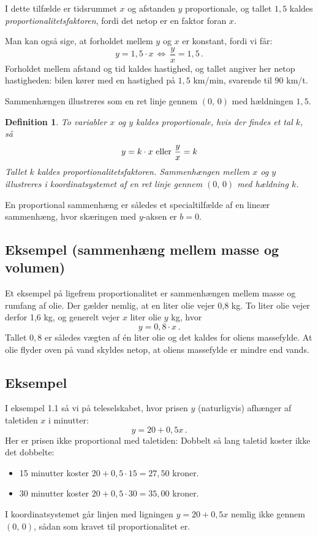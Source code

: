 \documentclass[12pt,oneside,a4paper]{article}
\newtheorem{mydef}[thm]{Definition}
\begin{document}
I dette tilfælde er tidsrummet $x$ og afstanden $y$ proportionale, og tallet
$1,5$ kaldes {\em proportionalitetsfaktoren}, fordi det netop er en faktor foran $x$.

Man kan også sige, at forholdet mellem $y$ og $x$ er konstant, fordi vi får:
\[
y = 1,5\cdot x \, \Leftrightarrow \, \frac{y}{x} = 1,5 \,.
\]
Forholdet mellem afstand og tid kaldes hastighed, og tallet angiver her netop
hastigheden: bilen kører med en hastighed på $1,5$ km/min, svarende til $90$
km/t.

Sammenhængen illustreres som en ret linje gennem $(0,\,0)$ med hældningen $1,5$.

\begin{tcolorbox}
\begin{mydef}
    To variabler $x$ og $y$ kaldes proportionale, hvis der findes et tal $k$, så
    $$
    y = k\cdot x \,\, {\rm eller} \,\, \frac{y}{x} = k
    $$
    Tallet $k$ kaldes proportionalitetsfaktoren. Sammenhængen mellem $x$ og $y$
    illustreres i koordinatsystemet af en ret linje gennem $(0,\,0)$ med 
    hældning $k$.
\end{mydef}
\end{tcolorbox}

En proportional sammenhæng er således et specialtilfælde af en lineær sammenhæng, hvor
skæringen med $y$-aksen er $b=0$.

\subsection{Eksempel (sammenhæng mellem masse og volumen)}

Et eksempel på ligefrem proportionalitet er sammenhængen mellem masse og rumfang af olie.
Der gælder nemlig, at en liter olie vejer 0,8 kg. To liter olie vejer derfor 1,6 kg,
og generelt vejer $x$ liter olie $y$ kg, hvor
\[
y = 0,8 \cdot x \,.
\]
Tallet $0,8$ er således vægten af én liter olie og det kaldes for oliens
massefylde.  At olie flyder oven på vand skyldes netop, at oliens massefylde er
mindre end vands.

\subsection{Eksempel}
I eksempel 1.1 så vi på teleselskabet, hvor prisen $y$ (naturligvis) afhænger af
taletiden $x$ i minutter:
\[
y=20+0,5x \,.
\]
Her er prisen ikke proportional med taletiden: Dobbelt så lang taletid koster ikke
det dobbelte:
\begin{itemize}
    \item 15 minutter koster $20+0,5\cdot 15 = 27,50$ kroner.
    \item 30 minutter koster $20+0,5\cdot 30 = 35,00$ kroner.
\end{itemize}
I koordinatsystemet går linjen med ligningen $y=20+0,5x$ nemlig ikke gennem
$(0,\, 0)$,
sådan som kravet til proportionalitet er.
\end{document}
